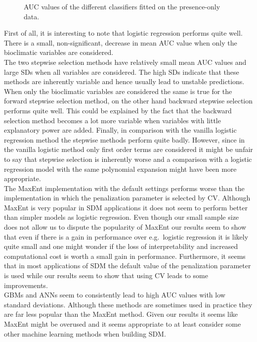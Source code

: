 \begin{figure}[!htb]
\center
{}
\caption{\label{fig:PrOnlyAUC}AUC values of the different classifiers fitted on the presence-only data.}
\end{figure}


First of all, it is interesting to note that logistic regression performs quite well. There is a small, non-significant, decrease in mean AUC value when only the bioclimatic variables are considered.\\

The two stepwise selection methods have relatively small mean AUC values and large SDs when all variables are considered. The high SDs indicate that these methods are inherently variable and hence usually lead to unstable predictions. When only the bioclimatic variables are considered the same is true for the forward stepwise selection method, on the other hand backward stepwise selection performs quite well. This could be explained by the fact that the backward selection method becomes a lot more variable when variables with little explanatory power are added. Finally, in comparison with the vanilla logistic regression method the stepwise methods perform quite badly. However, since in the vanilla logistic method only first order terms are considered it might be unfair to say that stepwise selection is inherently worse and a comparison with a logistic regression model with the same polynomial expansion might have been more appropriate. \\ 


The MaxEnt implementation with the default settings performs worse than the implementation in which the penalization parameter is selected by CV. Although MaxEnt is very popular in SDM applications it does not seem to perform better than simpler models as logistic regression. Even though our small sample size does not allow us to dispute the popularity of MaxEnt our results seem to show that even if there is a gain in performance over e.g.\ logistic regression it is likely quite small and one might wonder if the loss of interpretability and increased computational cost is worth a small gain in performance. Furthermore, it seems that in most applications of SDM the default value of the penalization parameter is used while our results seem to show that using CV leads to some improvements. \\

GBMs and ANNs seem to consistently lead to high AUC values with low standard deviations. Although these methods are sometimes used in practice they are far less popular than the MaxEnt method. Given our results it seems like MaxEnt might be overused and it seems appropriate to at least consider some other machine learning methods when building SDM. \\ 


